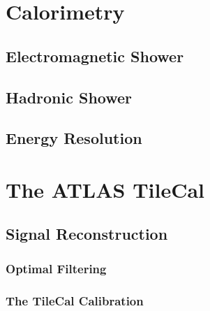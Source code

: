 \documentclass[10pt,twoside,cucitura,classica,english,openany]{toptesi}
\begin{document}
\section{Calorimetry}
\label{sec:calorimetry}



\subsection{Electromagnetic Shower}
\label{sec:electr-show}



\subsection{Hadronic Shower}
\label{sec:hadronic-shower}



\subsection{Energy Resolution}
\label{sec:energy-resolution}



\section{The ATLAS TileCal}
\label{sec:atlas-tilecal}



\subsection{Signal Reconstruction}
\label{sec:sign-reconstr}



\subsubsection{Optimal Filtering}
\label{sec:optimal-filtering}



\subsubsection{The TileCal Calibration}
\label{sec:tilecal-calibration}


\end{document}
